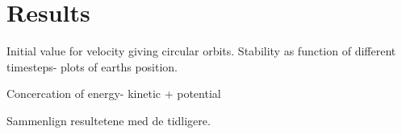 \documentclass[../main.tex]{subfiles}
\begin{document}
\section{Results}\label{results}


Initial value for velocity giving circular orbits.
Stability as function of different timesteps- plots of earths position.

Concercation of energy- kinetic + potential

Sammenlign resultetene med de tidligere. 
\end{document}
